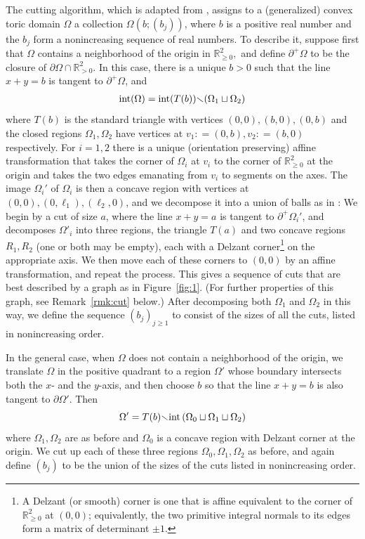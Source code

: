 \documentclass[11pt, reqno]{amsart}
\theoremstyle{remark}
\numberwithin{equation}{subsection}
\numberwithin{figure}{section}
\theoremstyle{customremark}
\newcommand{\intt}{{\rm int}}
\newcommand{\Om}{{\Omega}}
\newcommand{\less} {{\smallsetminus}}
\newcommand{\p}{{\partial}}
\newcommand{\R}{\mathbb{R}}
\begin{document}
The  cutting algorithm, which is adapted from \cite{CG},
assigns to a (generalized) convex toric domain $\Omega$ a collection $\Om(b; (b_j))$, where $b$ is a positive real number and the $b_j$ form  a nonincreasing sequence of real numbers. To describe it, suppose first that $\Om$  contains a neighborhood of the origin in $\R^2_{\ge 0},$ and define  $\p^+\Om$ to be the closure of $\p \Om\cap \R^2_{>0}$.
  In this case, there is a unique $b>0$ such that the line $x+y=b$ is tangent to $\p^+\Om$, and 
\begin{align}\label{eq:twoOm}
\intt(\Om) = \intt (T(b)) \less (\Om_1 \sqcup \Om_2)
\end{align}
where $T(b)$ is the standard triangle with vertices $(0,0), (b,0), (0,b)$
and the closed regions $\Om_1, \Om_2$ have vertices at $v_1: = (0,b), v_2: = (b,0)$  respectively.
For $i=1,2$ there is a unique (orientation preserving) affine transformation that takes the corner of $\Om_i$ at $v_i$
to the corner of $\R^2_{\ge 0}$ at the origin and takes the two edges emanating from $v_i$ to segments on the axes. The image $\Om_i'$ of $\Om_i$ is then a concave region  with vertices at $(0,0), (0,\ell_1), (\ell_2,0)$, and we decompose it into a union of balls as in \cite{CG}: We begin by a cut of size $a$, where the line $x+y=a$  is tangent to $\p^+ \Om_i'$, and decomposes $\Om'_i$ into three regions, the triangle $T(a)$ and two concave regions $R_1,R_2$ (one or both may be empty), each with a Delzant corner\footnote
{A Delzant (or smooth) corner is one that is affine equivalent to the corner of $\R^2_{\ge 0}$ at $(0,0)$; equivalently, the two primitive integral normals to its edges form a matrix of determinant $\pm 1$.} 
 on the appropriate axis.  
We then move each of these corners to $(0,0)$ by an affine transformation, and repeat the process. 
This gives a sequence of cuts that are best described by a graph as in 
Figure~\ref{fig:1}.   (For further properties of this graph, see Remark~\ref{rmk:cut} below.)
After decomposing both $\Om_1$ and $\Om_2$ in this way, we define
 the sequence
$(b_j)_{j\ge 1}$ to consist of the sizes of all the cuts, listed in nonincreasing order.


In the general case, when $\Om$ does not contain a neighborhood of the origin, we translate $\Om$ in the positive quadrant to a region $\Om'$ whose boundary intersects both the $x$- and the $y$-axis, and then choose $b$ so that the line $x+y=b$ is also tangent to $\p\Om'$.  Then 
$$
 \Om' = T(b) \less  \intt\,(\Om_0\sqcup \Om_1 \sqcup \Om_2)
$$
where  $\Om_1,\Om_2$ are as before and $\Om_0$ is a concave region with Delzant corner at the origin. 
We  cut up  each of these three regions $\Om_0, \Om_1, \Om_2$ as before, and again define $(b_j)$ to be the
union of the sizes of the cuts listed in nonincreasing order. 
\end{document}
